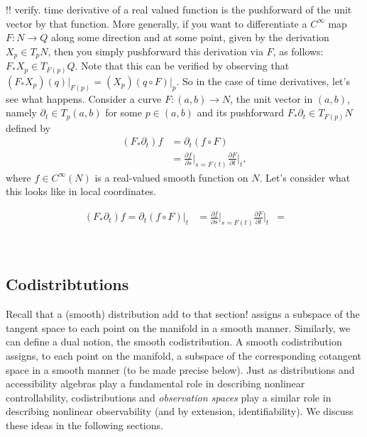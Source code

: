 \documentclass[psamsfonts]{amsart}
\theoremstyle{definition}
\theoremstyle{remark}
\numberwithin{equation}{section}
\begin{document}
{\color{blue} !! verify. time derivative of a real valued function is the pushforward of the unit vector by that function. More generally, if you want to differentiate a $C^{\infty}$ map $F:N \rightarrow Q$ along some direction and at some point, given by the derivation $X_p \in T_pN$, then you simply pushforward this derivation via $F$, as follows: $F_* X_p \in T_{F(p)}Q$. Note that this can be verified by observing that $(F_*X_p)(q)\bigr|_{F(p)} = (X_p)(q\circ F)\bigr|_{p}$. So in the case of time derivatives, let's see what happens. 
Consider a curve $F:(a, b) \rightarrow N$, the unit vector in $(a,b)$, namely $\partial_t\in T_p(a,b)$ for some $p \in (a, b)$ and its pushforward $F_*\partial_t \in T_{F(p)}N$ defined by 
\begin{align}
\left(F_* \partial_t \right)f & =  \partial_t (f\circ F)\\
& = \frac{\partial f}{\partial s}\biggr|_{s=F(t)}\frac{\partial F}{\partial t}\biggr|_{t},
\end{align}
where $f\in C^{\infty}(N)$ is a real-valued smooth function on $N$. Let's consider what this looks like in local coordinates. 

\begin{align}
\left(F_* \partial_t \right)f = \partial_t (f\circ F)\biggr|_t & = \frac{\partial f}{\partial s}\biggr|_{s=F(t)}\frac{\partial F}{\partial t}\biggr|_{t}
& =  
\end{align}
  }\\ 

  \subsection{Codistribtutions}





Recall that a (smooth) distribution {\color{red}add to that section!} assigns a subspace of the tangent space to each point on the manifold in a smooth manner. Similarly, we can define a dual notion, the smooth codistribution. A smooth codistribution assigns, to each point on the manifold, a subspace of the corresponding cotangent space in a smooth manner (to be made precise below). Just as distributions and accessibility algebras play a fundamental role in describing nonlinear controllability, codistributions and \textit{observation spaces} play a similar role in describing nonlinear observability (and by extension, identifiability). We discuss these ideas in the following sections. 
\end{document}
